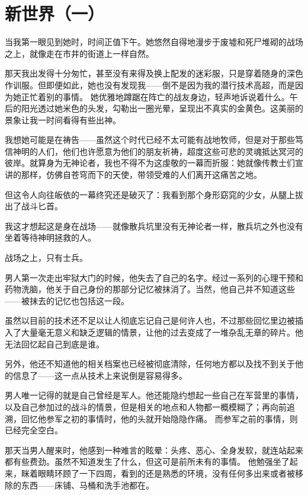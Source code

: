 
\chapter{新世界（一）}

\begin{QuoteEnv}{}
当我第一眼见到她时，时间正值下午。她悠然自得地漫步于废墟和死尸堆砌的战场之上，就像走在市井的街道上一样自然。

那天我出发得十分匆忙，甚至没有来得及换上配发的迷彩服，只是穿着随身的深色作训服。但即便如此，她也没有发现我——倒不是因为我的潜行技术高超，而是因为她正忙着别的事情。
她优雅地蹲踞在阵亡的战友身边，轻声地诉说着什么。午后的阳光透过她米色的头发，勾勒出一圈光晕，呈现出不真实的金黄色。这美丽的景象让我一时间看得有些出神。

我想她可能是在祷告——虽然这个时代已经不太可能有战地牧师，但是对于那些笃信神明的人们，他们也许愿意为他们的朋友祈祷，超度这些可悲的灵魂抵达冥河的彼岸。就算身为无神论者，我也不得不为这虔敬的一幕而折服：她就像传教士们宣讲的那样，仿佛自苍穹而下的天使，带领受难的人们离开这痛苦之地。

但这令人向往皈依的一幕终究还是破灭了：我看到那个身形窈窕的少女，从腿上拔出了战斗匕首。

我这才想起这是身在战场——就像散兵坑里没有无神论者一样，散兵坑之外也没有坐着等待神明拯救的人。

战场之上，只有士兵。
\end{QuoteEnv}

男人第一次走出牢狱大门的时候，他失去了自己的名字。经过一系列的心理干预和药物洗脑，他关于自己身份的那部分记忆被抹消了。当然，他自己并不知道这些——被抹去的记忆也包括这一段。

虽然以目前的技术还不足以让人彻底忘记自己是何许人也，不过那些回忆里边被插入了大量毫无意义和缺乏逻辑的情景，让他的过去变成了一堆杂乱无章的碎片。他无法回忆起自己到底是谁。

另外，他还不知道他的相关档案也已经被彻底清除，任何地方都以及找不到关于他的信息了——这一点从技术上来说倒是容易得多。

男人唯一记得的就是自己曾经是军人。他还能隐约想起一些自己在军营里的事情，以及自己参加过的战斗的情景，但是相关的地点和人物都一概模糊了；再向前追溯，回忆他参军之初的事情时，他的头就开始隐隐作痛。
而参军之前的事情，则已经完全空白。

那天当男人醒来时，他感到一种难言的眩晕：头疼、恶心、全身发软，就连站起来都有些费劲。虽然不知道发生了什么，但这可是前所未有的事情。
他勉强坐了起来，眯着眼睛环顾了一下四周，看到的还是熟悉的环境，没有任何多出来或者被移除的东西——床铺、马桶和洗手池都在。

